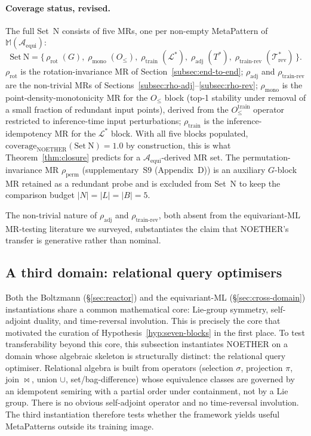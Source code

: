 \documentclass[manuscript]{acmart}
\begin{document}
\paragraph{Coverage status, revised.} The full Set~N consists of five MRs, one per non-empty MetaPattern of $\mathbb{M}(\mathcal{A}_{\mathrm{equi}})$:
$$
\mathrm{Set\ N} = \bigl\{\,\rho_{\mathrm{rot}}\;(G),\; \rho_{\mathrm{mono}}\;(O_{\le}),\; \rho_{\mathrm{train}}\;(\mathcal{L}^*),\; \rho_{\mathrm{adj}}\;(T^*),\; \rho_{\mathrm{train\text{-}rev}}\;(\mathcal{T}^{*}_{\mathrm{rev}})\,\bigr\}.
$$
$\rho_{\mathrm{rot}}$ is the rotation-invariance MR of Section~\ref{subsec:end-to-end}; $\rho_{\mathrm{adj}}$ and $\rho_{\mathrm{train\text{-}rev}}$ are the non-trivial MRs of Sections~\ref{subsec:rho-adj}--\ref{subsec:rho-rev}; $\rho_{\mathrm{mono}}$ is the point-density-monotonicity MR for the $O_{\le}$ block (top-1 stability under removal of a small fraction of redundant input points), derived from the $O_{\le}^{\mathrm{train}}$ operator restricted to inference-time input perturbations; $\rho_{\mathrm{train}}$ is the inference-idempotency MR for the $\mathcal{L}^*$ block. With all five blocks populated, $\mathrm{coverage}_{\mathrm{NOETHER}}(\mathrm{Set\ N}) = 1.0$ by construction, this is what Theorem~\ref{thm:closure} predicts for a $\mathcal{A}_{\mathrm{equi}}$-derived MR set. The permutation-invariance MR $\rho_{\mathrm{perm}}$ (supplementary~S9 (Appendix~D)) is an auxiliary $G$-block MR retained as a redundant probe and is excluded from Set~N to keep the comparison budget $|N| = |L| = |B| = 5$.

The non-trivial nature of $\rho_{\mathrm{adj}}$ and $\rho_{\mathrm{train\text{-}rev}}$, both absent from the equivariant-ML MR-testing literature we surveyed, substantiates the claim that NOETHER's transfer is generative rather than nominal.

\subsection{A third domain: relational query optimisers}
\label{subsec:third-domain}

Both the Boltzmann (\S\ref{sec:reactor}) and the equivariant-ML (\S\ref{sec:cross-domain}) instantiations share a common mathematical core: Lie-group symmetry, self-adjoint duality, and time-reversal involution. This is precisely the core that motivated the curation of Hypothesis~\ref{hyp:seven-blocks} in the first place. To test transferability beyond this core, this subsection instantiates NOETHER on a domain whose algebraic skeleton is structurally distinct: the relational query optimiser. Relational algebra is built from operators (selection $\sigma$, projection $\pi$, join $\bowtie$, union $\cup$, set/bag-difference) whose equivalence classes are governed by an idempotent semiring with a partial order under containment, not by a Lie group. There is no obvious self-adjoint operator and no time-reversal involution. The third instantiation therefore tests whether the framework yields useful MetaPatterns outside its training image.
\end{document}
